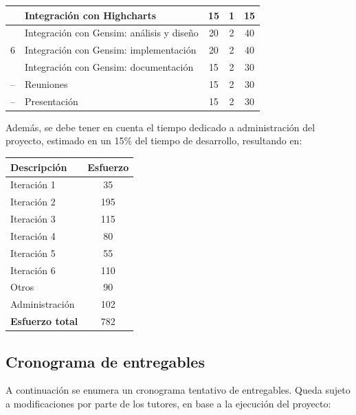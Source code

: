 \documentclass[12pt,a4paper]{article}
\begin{document}
\begin{center}
\begin{tabular}{ | c | l | c | c | c | }
                            & Integración con Highcharts                    & 15    & 1     & 15    \\ \hline
        \multirow{3}{*}{6}  & Integración con Gensim: análisis y diseño     & 20    & 2     & 40    \\ 
                            & Integración con Gensim: implementación        & 20    & 2     & 40    \\ 
                            & Integración con Gensim: documentación         & 15    & 2     & 30    \\ \hline
        --                  & Reuniones                                     & 15    & 2     & 30    \\ \hline
        --                  & Presentación                                  & 15    & 2     & 30    \\ \hline    
    \end{tabular}
\end{center}

Además, se debe tener en cuenta el tiempo dedicado a administración del proyecto, estimado en un 15\% del tiempo
de desarrollo, resultando en:

\begin{center}
    \begin{tabular}{ | l | c | }
    \hline
        \textbf{Descripción}    & \textbf{Esfuerzo} \\ \hline
        Iteración 1             & 35   \\ \hline
        Iteración 2             & 195  \\ \hline
        Iteración 3             & 115  \\ \hline
        Iteración 4             & 80   \\ \hline
        Iteración 5             & 55   \\ \hline
        Iteración 6             & 110  \\ \hline
        Otros                   & 90   \\ \hline
        Administración          & 102  \\ \hline \hline
        \textbf{Esfuerzo total} & 782  \\ \hline
    \end{tabular}
\end{center}

\subsection{Cronograma de entregables}
A continuación se enumera un cronograma tentativo de entregables. Queda sujeto a 
modificaciones por parte de los tutores, en base a la ejecución del proyecto:
\end{document}
